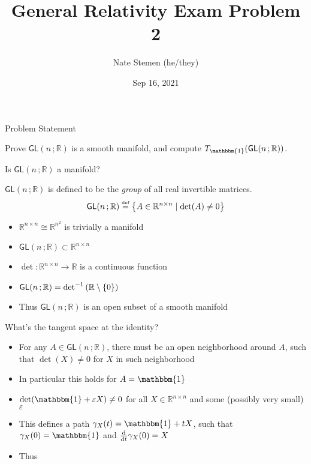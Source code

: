 \documentclass[11pt,aspectratio=1610,xcolor=dvipsnames]{beamer}
\title{General Relativity Exam Problem 2}
\date{Sep 16, 2021}
\author{Nate Stemen (he/they)}
\institute{AMATH 875}
\newcommand{\GL}[2]{\mathsf{GL}(#1\,; #2)}
\newcommand{\R}{\mathbb{R}}
\newcommand{\1}{\mathbbm{1}}
\newcommand{\defeq}{\stackrel{\text{\tiny def}}{=}}
\newcommand{\problemstatement}{Prove $\GL{n}{\R}$ is a smooth manifold, and compute $T_{\1}(\GL{n}{\R})$.}
\begin{document}
\maketitle

\begin{frame}{Problem Statement}
	\large
	\begin{prob}
		\problemstatement
	\end{prob}
\end{frame}

\begin{frame}{Is $\GL{n}{\R}$ a manifold?}
	\begin{definition}
		$\GL{n}{\R}$ is defined to be the \emph{group} of all real invertible matrices.
		\begin{equation*}
			\GL{n}{\R} \defeq \qty{A\in \R^{n\times n} \mid \det(A) \neq 0}
		\end{equation*}
	\end{definition}
	\pause
	\begin{itemize}[<+->]
		\item $\R^{n\times n} \cong \R^{n^2}$ is trivially a manifold
		\item $\GL{n}{\R}\subset \R^{n\times n}$
		\item $\det: \R^{n\times n} \to \R$ is a continuous function
		\item $\GL{n}{\R} = \det^{-1}\qty(\R\setminus\qty{0})$
		\item Thus $\GL{n}{\R}$ is an open subset of a smooth manifold
	\end{itemize}
\end{frame}

\begin{frame}{What's the tangent space at the identity?}
	\begin{itemize}[<+->]
		\item For any $A\in\GL{n}{\R}$, there must be an open neighborhood around $A$, such that $\det(X) \neq 0$ for $X$ in such neighborhood
		\item In particular this holds for $A = \1$
		\item $\det(\1 + \varepsilon X) \neq 0$ for all $X\in\R^{n\times n}$ and some (possibly very small) $\varepsilon$
		\item This defines a path $\gamma_X(t) = \1 + tX$, such that $\gamma_X(0) = \1$ and $\dv{t}\gamma_X(0) = X$
		\item Thus \tcbox[on line,boxsep=4pt, left=0pt,right=0pt,top=0pt,bottom=0pt,colframe=white,boxrule=0pt,colback=LightLavender,highlight math style={enhanced}]{$T_\1(\GL{n}{\R}) = \R^{n\times n}$}
	\end{itemize}
\end{frame}
\end{document}
